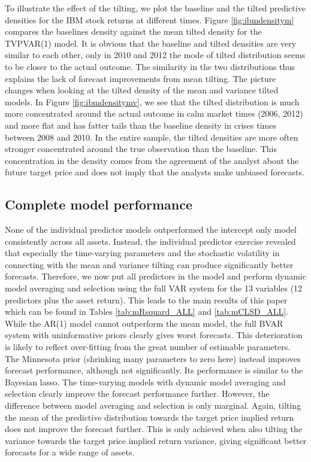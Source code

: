 \indent To illustrate the effect of the tilting, we plot the baseline and the tilted predictive densities for the IBM stock returns at different times. Figure \ref{fig:ibmdensitym} compares the baselines density against the mean tilted density for the TVPVAR(1) model. It is obvious that the baseline and tilted densities are very similar to each other, only in 2010 and 2012 the mode of tilted distribution seems to be closer to the actual outcome. The similarity in the two distributions thus explains the lack of forecast improvements from mean tilting.  The picture changes when looking at the tilted density of the mean and variance tilted models. In Figure \ref{fig:ibmdensitymv}, we see that the tilted distribution is much more concentrated around the actual outcome in calm market times (2006, 2012) and more flat and has fatter tails than the baseline density in crises times between 2008 and 2010. In the entire sample, the tilted densities are more often stronger concentrated around the true observation than the baseline. This concentration in the density comes from the agreement of the analyst about the future target price and does not imply that the analysts make unbiased forecasts.

\subsection{Complete model performance}
None of the individual predictor models outperformed the intercept only model consistently across all assets. Instead, the individual predictor exercise revealed that especially the time-varying parameters and the stochastic volatility in connecting with the mean and variance tilting can produce significantly better forecasts. Therefore, we now put all predictors in the model and perform dynamic model averaging and selection using the full VAR system for the 13 variables (12 predictors plus the asset return). This leads to the main results of this paper which can be found in Tables \ref{tab:mRsquard_ALL} and \ref{tab:mCLSD_ALL}. While the AR(1) model cannot outperform the mean model, the full BVAR system with uninformative priors clearly gives worst forecasts. This deterioration is likely to reflect over-fitting from the great number of estimable parameters. The Minnesota prior (shrinking many parameters to zero here) instead improves forecast performance, although not significantly. Its performance is similar to the Bayesian lasso. The time-varying models with dynamic model averaging and selection clearly improve the forecast performance further. However, the difference between model averaging and selection is only marginal.  Again, tilting the mean of the predictive distribution towards the target price implied return does not improve the forecast further. This is only achieved when also tilting the variance towards the target price implied return variance, giving significant better forecasts for a wide range of assets.


